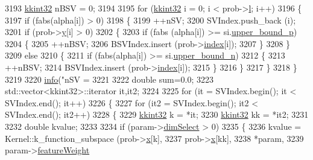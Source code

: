 \begin{DoxyCode}
{3193   \hyperlink{namespace_k_k_b_a8fa4952cc84fda1de4bec1fbdd8d5b1b}{kkint32} nBSV = 0;
3194 
3195   \textcolor{keywordflow}{for}  (\hyperlink{namespace_k_k_b_a8fa4952cc84fda1de4bec1fbdd8d5b1b}{kkint32} i = 0;  i < prob->\hyperlink{struct_s_v_m233_1_1svm__problem_a8e80c00adc45517f894b19ce879a0405}{l};  i++)
3196   \{
3197     \textcolor{keywordflow}{if}  (fabs(alpha[i]) > 0)
3198     \{
3199       ++nSV;
3200       SVIndex.push\_back (i);
3201       \textcolor{keywordflow}{if} (prob->\hyperlink{struct_s_v_m233_1_1svm__problem_a0883e07a3006cd2bb31eeb61c3a8c453}{y}[i] > 0)
3202       \{
3203         \textcolor{keywordflow}{if}  (fabs (alpha[i]) >= si.\hyperlink{struct_s_v_m233_1_1_solver_1_1_solution_info_a14db95d53a62445ec92ddea0b6ee17d4}{upper\_bound\_p})
3204         \{
3205           ++nBSV;
3206           BSVIndex.insert (prob->\hyperlink{struct_s_v_m233_1_1svm__problem_a4769752a28a7f99fa469fed248762504}{index}[i]);
3207         \}
3208       \}
3209       \textcolor{keywordflow}{else}
3210       \{
3211         \textcolor{keywordflow}{if}  (fabs(alpha[i]) >= si.\hyperlink{struct_s_v_m233_1_1_solver_1_1_solution_info_af558f84aa80ea9c97730c0cd0dca7ef9}{upper\_bound\_n})
3212         \{
3213           ++nBSV;
3214           BSVIndex.insert (prob->\hyperlink{struct_s_v_m233_1_1svm__problem_a4769752a28a7f99fa469fed248762504}{index}[i]);
3215         \}
3216       \}
3217     \}
3218   \}
3219 
3220   \hyperlink{namespace_s_v_m233_a0ebae296798b259c5fe4850260bc3d60}{info}(\textcolor{stringliteral}{"nSV = %
3221 
3222   \textcolor{keywordtype}{double} sum=0.0;
3223   std::vector<kkint32>::iterator it,it2;
3224 
3225   \textcolor{keywordflow}{for} (it = SVIndex.begin();  it < SVIndex.end();  it++)
3226   \{
3227     \textcolor{keywordflow}{for}  (it2 = SVIndex.begin(); it2 < SVIndex.end();  it2++)
3228     \{
3229       \hyperlink{namespace_k_k_b_a8fa4952cc84fda1de4bec1fbdd8d5b1b}{kkint32} k  = *it;
3230       \hyperlink{namespace_k_k_b_a8fa4952cc84fda1de4bec1fbdd8d5b1b}{kkint32} kk = *it2;
3231 
3232       \textcolor{keywordtype}{double} kvalue;
3233 
3234       \textcolor{keywordflow}{if}  (param->\hyperlink{struct_s_v_m233_1_1svm__parameter_a58954ba2ce4bb3cbc2c61ab9f7a31c69}{dimSelect} > 0)
3235       \{
3236         kvalue = Kernel::k\_function\_subspace (prob->\hyperlink{struct_s_v_m233_1_1svm__problem_a79a6083544d0f446a643167950c7e285}{x}[k], 
3237           prob->\hyperlink{struct_s_v_m233_1_1svm__problem_a79a6083544d0f446a643167950c7e285}{x}[kk], 
3238           *param, 
3239           param->\hyperlink{struct_s_v_m233_1_1svm__parameter_a1e602e5cf093a3e36d340957656b091b}{featureWeight}
}}
\end{DoxyCode}
